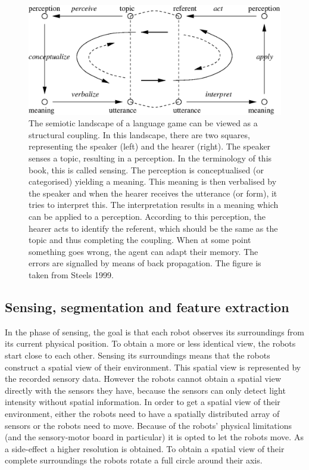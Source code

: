 
\begin{figure}[t]
\centerline{\includegraphics[width=\textwidth]{discr_games/semiotic1.eps}}
\caption{The semiotic landscape of a language game can be viewed as a structural coupling. In this landscape, there are two squares, representing the speaker (left) and the hearer (right). The speaker senses a topic, resulting in a perception. In the terminology of this book, this is called sensing. The perception is conceptualised (or categorised) yielding a meaning. This meaning is then verbalised by the speaker and when the hearer receives the utterance (or form), it tries to interpret this. The interpretation results in a meaning which can be applied to a perception. According to this perception, the hearer acts to identify the referent, which should be the same as the topic and thus completing the coupling. When at some point something goes wrong, the agent can adapt their memory. The errors are signalled by means of back propagation. The figure is taken from Steels 1999.}
\label{f:cm:semiotic}
\end{figure}

\subsection{Sensing, segmentation and feature extraction}\label{s:lg:perception}


In the phase of sensing, the goal is that each robot observes its surroundings from its current physical position. To obtain a more or less identical view, the robots start close to each other. Sensing its surroundings means that the robots construct a spatial view of their environment. This spatial view is represented by the recorded sensory data. However the robots cannot obtain a spatial view directly with the sensors they have, because the sensors can only detect light intensity without spatial information. In order to get a spatial view of their environment, either the robots need to have a spatially distributed array of sensors or the robots need to move. Because of the robots' physical limitations (and the sensory-motor board in particular) it is opted to let the robots move. As a side-effect a higher resolution is obtained. To obtain a spatial view of their complete surroundings the robots rotate a full circle around their axis.

